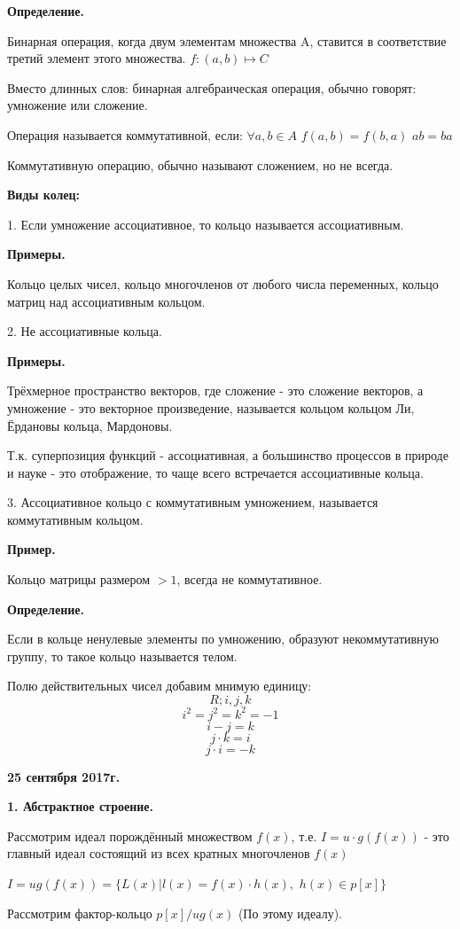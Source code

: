 \documentclass{article}
\begin{document}
{\bf Определение.}

Бинарная операция, когда двум элементам множества A, ставится в соответствие третий элемент этого множества. $f: (a, b) \mapsto C$

Вместо длинных слов: бинарная алгебраическая операция, обычно говорят: умножение или сложение.

Операция называется коммутативной, если: $\forall a, b \in A$ $f(a,b)=f(b,a)$ $ab=ba$

Коммутативную операцию, обычно называют сложением, но не всегда.

{\bf Виды колец:}

1. Если умножение ассоциативное, то кольцо называется ассоциативным.

{\bf Примеры.}

Кольцо целых чисел, кольцо многочленов от любого числа переменных, кольцо матриц над ассоциативным кольцом.

2. Не ассоциативные кольца.

{\bf Примеры.}

Трёхмерное пространство векторов, где сложение - это сложение векторов, а умножение - это векторное произведение, называется кольцом кольцом Ли, Ёрдановы кольца, Мардоновы.

Т.к. суперпозиция функций - ассоциативная, а большинство процессов в природе и науке - это отображение, то чаще всего встречается ассоциативные кольца.

3. Ассоциативное кольцо с коммутативным умножением, называется коммутативным кольцом.

{\bf Пример.}

Кольцо матрицы размером $> 1$, всегда не коммутативное.

{\bf Определение.}

Если в кольце ненулевые элементы по умножению, образуют некоммутативную группу, то такое кольцо называется телом.

Полю действительных чисел добавим мнимую единицу:
$$R; i,j,k$$
$$i^2=j^2=k^2=-1$$
$$i-j=k$$
$$j\cdot k=i$$
$$j\cdot i=-k$$

\textbf {25 сентября 2017г.}

{\bf 1. Абстрактное строение.}

Рассмотрим идеал порождённый множеством $f(x)$, т.е. $I=u\cdot g(f(x))$ - это главный идеал состоящий из всех кратных многочленов $f(x)$

$I=ug(f(x))=\{L(x)|l(x)=f(x)\cdot h(x), $ $ h(x) \in p[x]\}$

Рассмотрим фактор-кольцо $p[x]/ug(x)$ (По этому идеалу).
\end{document}

